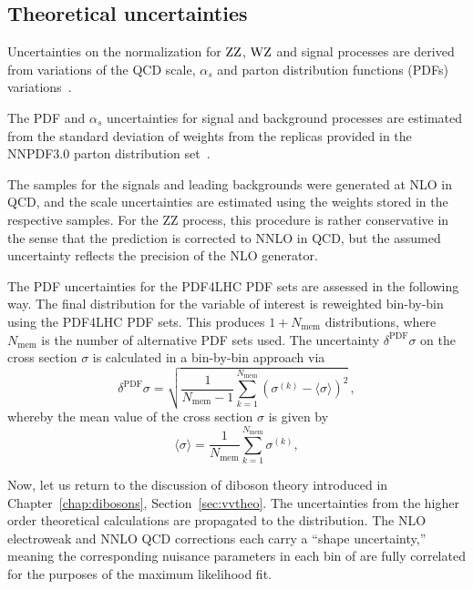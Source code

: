 \subsection{Theoretical uncertainties}
\label{subsec:dmtheo}

Uncertainties on the normalization for $\mathrm{Z}\mathrm{Z}$, $\mathrm{W}\mathrm{Z}$ and signal
processes are derived from variations of the QCD scale, $\alpha_{s}$
and parton distribution functions (PDFs)
variations~\cite{Botje:2011sn,Alekhin:2011sk,Lai:2010vv,Martin:2009iq,Ball:2011mu,MCFM}. 

The PDF and $\alpha_s$ uncertainties for signal and background processes are estimated 
from the standard deviation of weights from the replicas provided in the 
NNPDF3.0 parton distribution set~\cite{nnpdf}.

The samples for the signals and leading backgrounds were generated at NLO in QCD,
and the scale uncertainties are estimated using the weights
stored in the respective samples. For the ZZ process, this procedure is rather conservative
in the sense that the prediction is corrected to NNLO in QCD, but the assumed uncertainty reflects
the precision of the NLO generator.

The PDF uncertainties for the PDF4LHC PDF sets are assessed in the following way.
The final distribution for the variable of interest is reweighted bin-by-bin using the PDF4LHC PDF sets.
This produces $1+N_{\textrm{mem}}$ distributions, where $N_{\textrm{mem}}$ is the number of alternative PDF sets used.
The uncertainty $\delta^{\textrm{PDF}}\sigma$ on the cross section $\sigma$ is calculated in a bin-by-bin approach via
\begin{equation}
\delta^{\textrm{PDF}} \sigma= \sqrt{ \frac{1}{N_{\textrm{mem}} - 1} \sum_{k=1}^{N_{\textrm{mem}}} \left(\sigma^{(k)} - \langle \sigma \rangle\right)^2 }\,,
\end{equation}
whereby the mean value of the cross section $\sigma$ is given by
\begin{equation}
\langle\sigma\rangle = \frac{1}{N_{\textrm{mem}}} \sum_{k=1}^{N_{\textrm{mem}}} \sigma^{(k)},
\end{equation}

Now, let us return to the discussion of diboson theory introduced in Chapter~\ref{chap:dibosons}, Section~\ref{sec:vvtheo}.
The uncertainties from the higher order theoretical calculations are propagated to the \ETm distribution.
The NLO electroweak and NNLO QCD corrections each carry a ``shape uncertainty,''
meaning the corresponding nuisance parameters in each bin of \ETm are fully correlated for the
purposes of the maximum likelihood fit.


